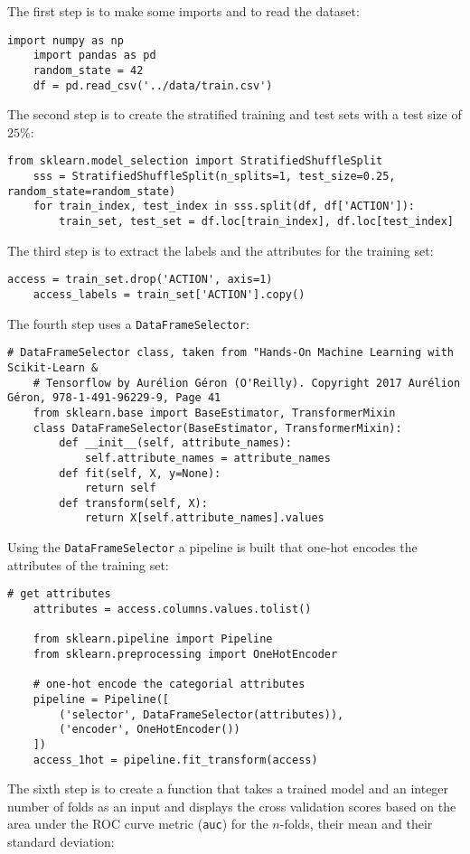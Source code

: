 \documentclass[11pt]{article}
\begin{document}
The first step is to make some imports and to read the dataset:
\begin{lstlisting}[frame=single]
    import numpy as np
    import pandas as pd
    random_state = 42
    df = pd.read_csv('../data/train.csv')
\end{lstlisting}
\noindent  
The second step is to create the stratified training and test sets with a test size of $25 \%$:

\begin{lstlisting}[frame=single]
    from sklearn.model_selection import StratifiedShuffleSplit
    sss = StratifiedShuffleSplit(n_splits=1, test_size=0.25, random_state=random_state)
    for train_index, test_index in sss.split(df, df['ACTION']):
        train_set, test_set = df.loc[train_index], df.loc[test_index]
\end{lstlisting}
\noindent
The third step is to extract the labels and the attributes for the training set:

\begin{lstlisting}[frame=single]
    access = train_set.drop('ACTION', axis=1)
    access_labels = train_set['ACTION'].copy()
\end{lstlisting}
\noindent
The fourth step uses a {\tt DataFrameSelector}:

\begin{lstlisting}[frame=single]
    # DataFrameSelector class, taken from "Hands-On Machine Learning with Scikit-Learn & 
    # Tensorflow by Aurélion Géron (O'Reilly). Copyright 2017 Aurélion Géron, 978-1-491-96229-9, Page 41
    from sklearn.base import BaseEstimator, TransformerMixin
    class DataFrameSelector(BaseEstimator, TransformerMixin):
        def __init__(self, attribute_names):
            self.attribute_names = attribute_names
        def fit(self, X, y=None):
            return self
        def transform(self, X):
            return X[self.attribute_names].values
\end{lstlisting}
\noindent
Using the {\tt DataFrameSelector} a pipeline is built that one-hot encodes the attributes of the 
training set:

\begin{lstlisting}[frame=single]
    # get attributes
    attributes = access.columns.values.tolist()

    from sklearn.pipeline import Pipeline
    from sklearn.preprocessing import OneHotEncoder

    # one-hot encode the categorial attributes
    pipeline = Pipeline([
        ('selector', DataFrameSelector(attributes)),
        ('encoder', OneHotEncoder())
    ])
    access_1hot = pipeline.fit_transform(access)
\end{lstlisting}
\noindent
The sixth step is to create a function that takes a trained model and an integer
number of folds as an input and displays the cross validation scores based
on the area under the ROC curve metric ({\tt auc}) for the $n$-folds,
their mean and their standard deviation:
\end{document}
